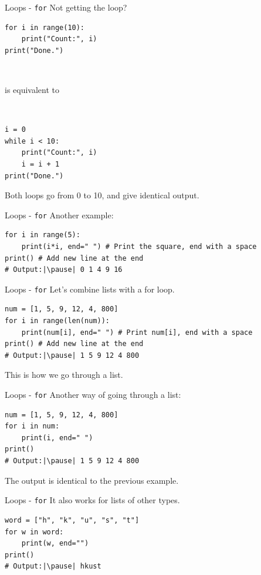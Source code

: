 \documentclass[dvipsnames, svgnames, x11names, handout]{beamer}
\begin{document}
\begin{frame}[fragile]{Loops - \texttt{for}}
Not getting the loop?
\begin{verbatim}
for i in range(10):
    print("Count:", i)
print("Done.")
\end{verbatim}

\

is equivalent to

\

\begin{verbatim}
i = 0
while i < 10:
    print("Count:", i)
    i = i + 1
print("Done.")
\end{verbatim}

Both loops go from 0 to 10, and give identical output.
\end{frame}

\begin{frame}[fragile]{Loops - \texttt{for}}
Another example:
\begin{verbatim}
for i in range(5):
    print(i*i, end=" ") # Print the square, end with a space
print() # Add new line at the end
# Output:|\pause| 0 1 4 9 16
\end{verbatim}
\end{frame}

\begin{frame}[fragile]{Loops - \texttt{for}}
Let's combine lists with a for loop.
\begin{verbatim}
num = [1, 5, 9, 12, 4, 800]
for i in range(len(num)):
    print(num[i], end=" ") # Print num[i], end with a space
print() # Add new line at the end
# Output:|\pause| 1 5 9 12 4 800
\end{verbatim}
\pause This is how we go through a list.
\end{frame}

\begin{frame}[fragile]{Loops - \texttt{for}}
Another way of going through a list:
\begin{verbatim}
num = [1, 5, 9, 12, 4, 800]
for i in num:
    print(i, end=" ")
print()
# Output:|\pause| 1 5 9 12 4 800
\end{verbatim}
\pause The output is identical to the previous example.
\end{frame}

\begin{frame}[fragile]{Loops - \texttt{for}}
It also works for lists of other types.
\begin{verbatim}
word = ["h", "k", "u", "s", "t"]
for w in word:
    print(w, end="")
print()
# Output:|\pause| hkust
\end{verbatim}
\end{frame}
\end{document}
